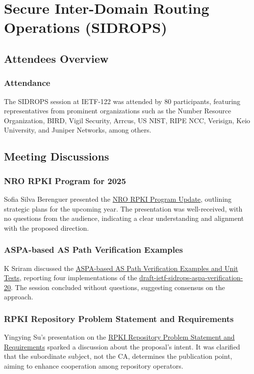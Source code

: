 \documentclass{article}
\begin{document}
\newpage

\section{Secure Inter-Domain Routing Operations (SIDROPS)}

\subsection{Attendees Overview}
\subsubsection{Attendance}
The SIDROPS session at IETF-122 was attended by 80 participants, featuring representatives from prominent organizations such as the Number Resource Organization, BIRD, Vigil Security, Arrcus, US NIST, RIPE NCC, Verisign, Keio University, and Juniper Networks, among others.

\subsection{Meeting Discussions}

\subsubsection{NRO RPKI Program for 2025}
Sofia Silva Berenguer presented the \href{https://datatracker.ietf.org/meeting/122/materials/slides-122-sidrops-nro-rpki-program-update-sofia-00}{NRO RPKI Program Update}, outlining strategic plans for the upcoming year. The presentation was well-received, with no questions from the audience, indicating a clear understanding and alignment with the proposed direction.

\subsubsection{ASPA-based AS Path Verification Examples}
K Sriram discussed the \href{https://datatracker.ietf.org/meeting/122/materials/slides-122-sidrops-aspa-based-as-path-verification-examples-and-unit-tests-00}{ASPA-based AS Path Verification Examples and Unit Tests}, reporting four implementations of the \href{https://datatracker.ietf.org/doc/html/draft-ietf-sidrops-aspa-verification-20}{draft-ietf-sidrops-aspa-verification-20}. The session concluded without questions, suggesting consensus on the approach.

\subsubsection{RPKI Repository Problem Statement and Requirements}
Yingying Su's presentation on the \href{https://datatracker.ietf.org/meeting/122/materials/slides-122-sidrops-rpki-repository-problem-statement-and-requirements-00}{RPKI Repository Problem Statement and Requirements} sparked a discussion about the proposal's intent. It was clarified that the subordinate subject, not the CA, determines the publication point, aiming to enhance cooperation among repository operators.
\end{document}
